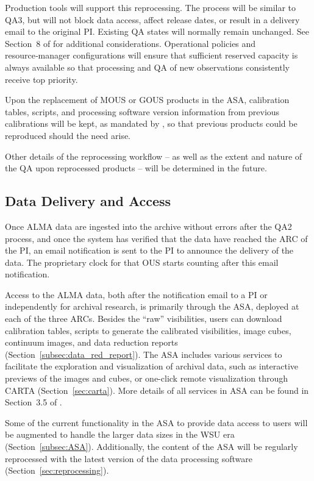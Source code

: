 Production tools will support this reprocessing. The  process will be  similar to QA3, but will not block data access,  affect release dates, or result in a delivery email to the original PI. Existing QA states  will  
normally remain unchanged.  See Section~8 of \cite{dpomrTsi} for additional considerations.  
Operational policies and resource‑manager configurations will ensure that sufficient reserved capacity is always available so that processing and QA of new observations consistently receive top priority.

Upon the replacement of MOUS or GOUS products  in the ASA, calibration tables, scripts, and processing software version information from previous calibrations will be kept, as mandated by \cite{isopt_implementation_plan}, so that previous products could be reproduced should the need arise.

Other details of the reprocessing workflow -- as well as the extent and nature of the \ac{QA} upon reprocessed products -- will be determined in the future.


\subsection{Data Delivery and Access}\label{subsec:data_delivery}

Once ALMA data are ingested into the archive without errors after the QA2 process, and once the system has verified that the data have reached the ARC of the PI, an email notification is sent to the PI to announce the delivery of the data. The proprietary clock for that \ac{OUS} starts counting after this email notification.

Access to the ALMA data, both after the notification email to a PI or independently for archival research, is primarily through the \ac{ASA}, deployed at each of the three ARCs. Besides the “raw” visibilities, users can download calibration tables, scripts to generate the calibrated visibilities, image cubes, continuum images, and data reduction reports (Section~\ref{subsec:data_red_report}). 
The \ac{ASA} includes various services to facilitate the exploration and visualization of archival data, such as interactive previews of the images and cubes, or one-click remote visualization through CARTA (Section~\ref{sec:carta}).  More details of all services in \ac{ASA} can be found in Section~3.5 of \cite{CSA-IA}. 

Some of the current functionality in the ASA to provide data access to users will be augmented to handle the larger data sizes in the WSU era (Section~\ref{subsec:ASA}). Additionally, the content of the ASA will be regularly reprocessed with the latest version of the data processing software (Section~\ref{sec:reprocessing}).


